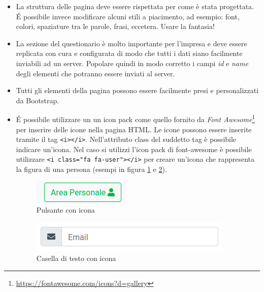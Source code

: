\documentclass[addpoints,12pt,answers]{exam}
\begin{document}
\begin{itemize}
        \item La struttura delle pagina deve essere rispettata per come è stata progettata. \'E possibile invece modificare alcuni stili a piacimento, ad esempio: font, colori, spaziature tra le parole, frasi, eccetera. Usare la fantasia!

        \item La sezione del questionario è molto importante per l'impresa e deve essere replicata con cura e configurata di modo che tutti i dati siano facilmente inviabili ad un server. Popolare quindi in modo corretto i campi \emph{id} e \emph{name} degli elementi che potranno essere inviati al server.

        \item Tutti gli elementi della pagina possono essere facilmente presi e personalizzati da Bootstrap. 

        \item \'E possibile utilizzare un un icon pack come quello fornito da \emph{Font Awesome}\footnote{\href{https://fontawesome.com/icons?d=gallery}{https://fontawesome.com/icons?d=gallery}} per inserire delle icone nella pagina HTML. Le icone possono essere inserite tramite il tag \texttt{<i></i>}. Nell'attributo class del suddetto tag è possibile indicare un'icona. Nel caso si utilizzi l'icon pack di font-awesome è possibile utilizzare \texttt{<i class="fa fa-user"></i>} per creare un'icona che rappresenta la figura di una persona (esempi in figura \ref{fig:button-icon} e \ref{fig:text-input-icon}). 

        \begin{figure}
            \centering
            \includegraphics[scale=0.7]{img/button-icon.png}
            \caption{Pulsante con icona}
            \label{fig:button-icon}
        \end{figure}

        \begin{figure}
            \centering
            \includegraphics[scale=0.7]{img/text-input-icon.png}
            \caption{Casella di testo con icona}
            \label{fig:text-input-icon}
        \end{figure}


\end{itemize}
\end{document}
